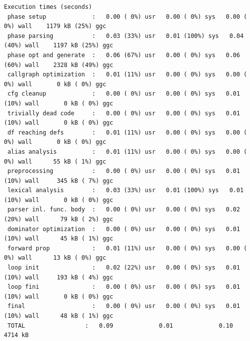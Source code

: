 \begin{scriptsize}
\begin{verbatim}
Execution times (seconds)
 phase setup             :   0.00 ( 0%) usr   0.00 ( 0%) sys   0.00 ( 0%) wall    1179 kB (25%) ggc
 phase parsing           :   0.03 (33%) usr   0.01 (100%) sys   0.04 (40%) wall    1197 kB (25%) ggc
 phase opt and generate  :   0.06 (67%) usr   0.00 ( 0%) sys   0.06 (60%) wall    2328 kB (49%) ggc
 callgraph optimization  :   0.01 (11%) usr   0.00 ( 0%) sys   0.00 ( 0%) wall       0 kB ( 0%) ggc
 cfg cleanup             :   0.00 ( 0%) usr   0.00 ( 0%) sys   0.01 (10%) wall       0 kB ( 0%) ggc
 trivially dead code     :   0.00 ( 0%) usr   0.00 ( 0%) sys   0.01 (10%) wall       0 kB ( 0%) ggc
 df reaching defs        :   0.01 (11%) usr   0.00 ( 0%) sys   0.00 ( 0%) wall       0 kB ( 0%) ggc
 alias analysis          :   0.01 (11%) usr   0.00 ( 0%) sys   0.00 ( 0%) wall      55 kB ( 1%) ggc
 preprocessing           :   0.00 ( 0%) usr   0.00 ( 0%) sys   0.01 (10%) wall     345 kB ( 7%) ggc
 lexical analysis        :   0.03 (33%) usr   0.01 (100%) sys   0.01 (10%) wall       0 kB ( 0%) ggc
 parser inl. func. body  :   0.00 ( 0%) usr   0.00 ( 0%) sys   0.02 (20%) wall      79 kB ( 2%) ggc
 dominator optimization  :   0.00 ( 0%) usr   0.00 ( 0%) sys   0.01 (10%) wall      45 kB ( 1%) ggc
 forward prop            :   0.01 (11%) usr   0.00 ( 0%) sys   0.00 ( 0%) wall      13 kB ( 0%) ggc
 loop init               :   0.02 (22%) usr   0.00 ( 0%) sys   0.01 (10%) wall     193 kB ( 4%) ggc
 loop fini               :   0.00 ( 0%) usr   0.00 ( 0%) sys   0.01 (10%) wall       0 kB ( 0%) ggc
 final                   :   0.00 ( 0%) usr   0.00 ( 0%) sys   0.01 (10%) wall      48 kB ( 1%) ggc
 TOTAL                 :   0.09             0.01             0.10               4714 kB
\end{verbatim}
\end{scriptsize}

